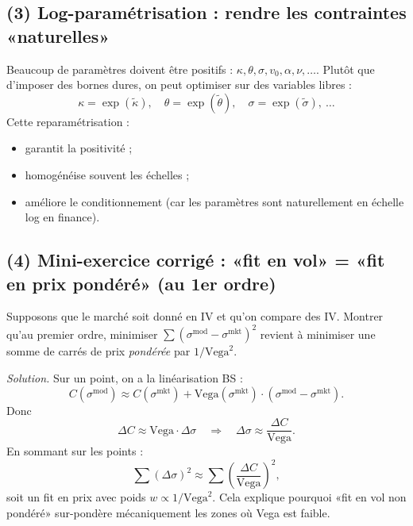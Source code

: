 \subsection*{(3) Log-paramétrisation : rendre les contraintes «naturelles»}
Beaucoup de paramètres doivent être positifs : $\kappa,\theta,\sigma,v_0,\alpha,\nu,\dots$.
Plutôt que d'imposer des bornes dures, on peut optimiser sur des variables libres :
\[
\kappa=\exp(\widetilde\kappa),\quad \theta=\exp(\widetilde\theta),\quad \sigma=\exp(\widetilde\sigma),\ \dots
\]
Cette reparamétrisation :
\begin{itemize}[leftmargin=*]
\item garantit la positivité ;
\item homogénéise souvent les échelles ;
\item améliore le conditionnement (car les paramètres sont naturellement en échelle log en finance).
\end{itemize}

\subsection*{(4) Mini-exercice corrigé : «fit en vol» = «fit en prix pondéré» (au 1er ordre)}
Supposons que le marché soit donné en IV et qu'on compare des IV.
Montrer qu'au premier ordre, minimiser $\sum (\sigma^{\mathrm{mod}}-\sigma^{\mathrm{mkt}})^2$ revient à minimiser une somme de carrés de prix \emph{pondérée} par $1/\mathrm{Vega}^2$.

\emph{Solution.}
Sur un point, on a la linéarisation BS :
\[
C(\sigma^{\mathrm{mod}})\approx C(\sigma^{\mathrm{mkt}})+\mathrm{Vega}(\sigma^{\mathrm{mkt}})\cdot(\sigma^{\mathrm{mod}}-\sigma^{\mathrm{mkt}}).
\]
Donc
\[
\Delta C \approx \mathrm{Vega}\cdot \Delta\sigma
\quad\Rightarrow\quad
\Delta\sigma \approx \frac{\Delta C}{\mathrm{Vega}}.
\]
En sommant sur les points :
\[
\sum (\Delta\sigma)^2 \approx \sum \left(\frac{\Delta C}{\mathrm{Vega}}\right)^2,
\]
soit un fit en prix avec poids $w\propto 1/\mathrm{Vega}^2$.
Cela explique pourquoi «fit en vol non pondéré» sur-pondère mécaniquement les zones où Vega est faible.
